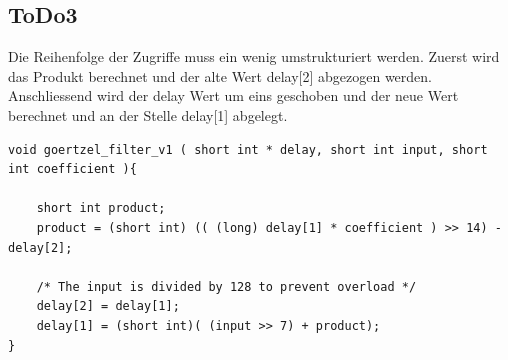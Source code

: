 \documentclass[a4paper,11pt]{article}
\begin{document}
\subsection{ToDo3}
Die Reihenfolge der Zugriffe muss ein wenig umstrukturiert werden. Zuerst wird das Produkt berechnet und der alte Wert delay[2] abgezogen werden. Anschliessend wird der delay Wert um eins geschoben und der neue Wert berechnet und an der Stelle delay[1] abgelegt. 
\begin{lstlisting}
void goertzel_filter_v1 ( short int * delay, short int input, short int coefficient ){
	
	short int product;
	product = (short int) (( (long) delay[1] * coefficient ) >> 14) - delay[2];

	/* The input is divided by 128 to prevent overload */
	delay[2] = delay[1];
	delay[1] = (short int)( (input >> 7) + product);
}
\end{lstlisting}
\end{document}
